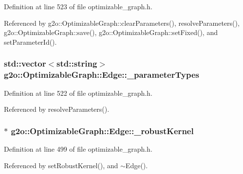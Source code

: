 Definition at line 523 of file optimizable\+\_\+graph.\+h.



Referenced by g2o\+::\+Optimizable\+Graph\+::clear\+Parameters(), resolve\+Parameters(), g2o\+::\+Optimizable\+Graph\+::save(), g2o\+::\+Optimizable\+Graph\+::set\+Fixed(), and set\+Parameter\+Id().

\subsubsection[{\texorpdfstring{\+\_\+parameter\+Types}{_parameterTypes}}]{\setlength{\rightskip}{0pt plus 5cm}std\+::vector$<$std\+::string$>$ g2o\+::\+Optimizable\+Graph\+::\+Edge\+::\+\_\+parameter\+Types\hspace{0.3cm}{\ttfamily [protected]}}\hypertarget{classg2o_1_1OptimizableGraph_1_1Edge_a08666609850240956c64c95ae5ae0f2c}{}\label{classg2o_1_1OptimizableGraph_1_1Edge_a08666609850240956c64c95ae5ae0f2c}


Definition at line 522 of file optimizable\+\_\+graph.\+h.



Referenced by resolve\+Parameters().

\subsubsection[{\texorpdfstring{\+\_\+robust\+Kernel}{_robustKernel}}]{$\ast$ g2o\+::\+Optimizable\+Graph\+::\+Edge\+::\+\_\+robust\+Kernel\hspace{0.3cm}{\ttfamily [protected]}}\hypertarget{classg2o_1_1OptimizableGraph_1_1Edge_a6b942321f9e4e82051d529efb255af35}{}\label{classg2o_1_1OptimizableGraph_1_1Edge_a6b942321f9e4e82051d529efb255af35}


Definition at line 499 of file optimizable\+\_\+graph.\+h.



Referenced by set\+Robust\+Kernel(), and $\sim$\+Edge().



